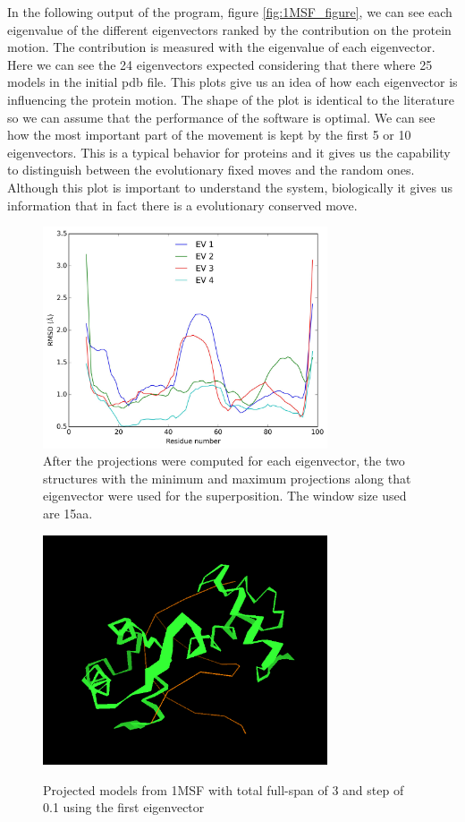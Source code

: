 \documentclass[12pt]{article}
\begin{document}
In the following output of the program, figure \ref{fig:1MSF_figure}, we can see each eigenvalue of the different eigenvectors ranked by the contribution on the protein motion. The contribution is measured with the eigenvalue of each eigenvector. Here we can see the 24 eigenvectors expected considering that there where 25 models in the initial pdb file. This plots give us an idea of how each eigenvector is influencing the protein motion. The shape of the plot is identical to the literature \citep{VanAalten1998} so we can assume that the performance of the software is optimal. We can see how the most important part of the movement is kept by the first 5 or 10 eigenvectors. This is a typical behavior for proteins and it gives us the capability to distinguish between the evolutionary fixed moves and the random ones. Although this plot is important to understand the system, biologically it gives us information that in fact there is a evolutionary conserved move.  

\begin{figure} [t]
\centering
\includegraphics[width=0.75\textwidth]{Normal_Modes_residue}
\caption{After the projections were computed for each eigenvector, the two structures with the minimum and maximum projections along that eigenvector were used for the superposition. The window size used are 15aa.}
\label{fig:1MSF_residue}
\end{figure}

\begin{figure} [t]
\centering
\includegraphics[width=0.75\textwidth]{1msf_allstates}
\label{fig:1msf_all}
\caption{Projected models from 1MSF with total full-span of 3 and step of 0.1 using the first eigenvector}
\end{figure}
\end{document}
